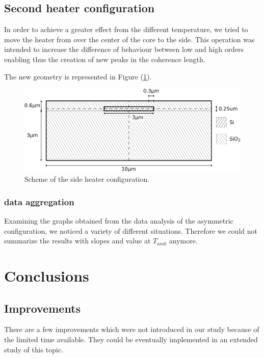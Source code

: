 \documentclass[12pt,a4paper,twoside]{article}
\begin{document}
\subsection{Second heater configuration}
In order to achieve a greater effect from the different temperature, we tried to move the heater from over the center of the core to the side.
This operation was intended to increase the difference of behaviour between low and high orders enabling thus the creation of new peaks in the coherence length.

The new geometry is represented in Figure (\ref{fig_geometry_asym}).
\begin{figure}[!ht]
	\centering
	\includegraphics[width=1\textwidth]{geometryA.pdf}
	\caption{Scheme of the side heater configuration.}
	\label{fig_geometry_asym}
\end{figure}

\subsubsection{data aggregation}
Examining the graphs obtained from the data analysis of the asymmetric configuration, we noticed a variety of different situations.
Therefore we could not summarize the results with slopes and value at $T_{amb}$ anymore.


\section{Conclusions}
\subsection{Improvements}

There are a few improvements which were not introduced in our study because of the limited time available.
They could be eventually implemented in an extended study of this topic.
\end{document}
